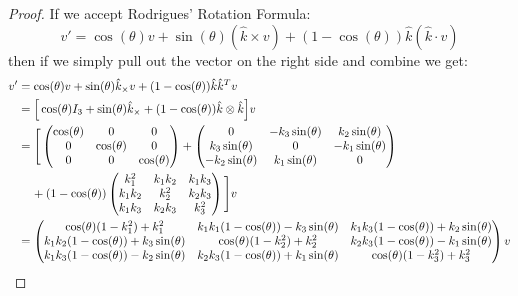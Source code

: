 \documentclass[12pt, letterpaper, onecolumn, conference, final]{IEEEtran}
\theoremstyle{definition}
\theoremstyle{plain}
\begin{document}
\begin{proof}
If we accept Rodrigues' Rotation Formula:
\begin{equation*}
v' = \cos(\theta)v + \sin(\theta)(\hat{k} \times v) + (1 - \cos(\theta))\hat{k}(\hat{k} \cdot v)
\end{equation*}
then if we simply pull out the vector on the right side and combine we get:
\begin{equation*}
\begin{split}
v' &= \cos(\theta)v + \sin(\theta)\hat{k}_{\times}v + (1 - \cos(\theta))\hat{k}\hat{k}^T v \\
&= \Big[ \cos(\theta)I_3 + \sin(\theta)\hat{k}_{\times} + (1 - \cos(\theta))\hat{k} \otimes \hat{k} \Big] v \\
&= \Bigg[ \begin{pmatrix}
\cos(\theta) & 0 & 0 \\
0 & \cos(\theta) & 0 \\
0 & 0 & \cos(\theta)
\end{pmatrix} + \begin{pmatrix}
0 & -k_3\sin(\theta) & k_2\sin(\theta) \\
k_3\sin(\theta) & 0 & -k_1\sin(\theta) \\
-k_2\sin(\theta) & k_1\sin(\theta) & 0
\end{pmatrix} \\
& \hspace{.4cm} + (1 - \cos(\theta))\begin{pmatrix}
k_1^2 & k_1k_2 & k_1k_3 \\
k_1k_2 & k_2^2 & k_2k_3 \\
k_1k_3 & k_2k_3 & k_3^2
\end{pmatrix} \Bigg] v \\
&= \begin{pmatrix}
\cos(\theta)(1 - k_1^2) + k_1^2 & k_1k_1(1 - \cos(\theta)) - k_3\sin(\theta) & k_1k_3(1 - \cos(\theta)) + k_2\sin(\theta) \\
k_1k_2(1 - \cos(\theta)) + k_3\sin(\theta) & \cos(\theta)(1 - k_2^2) + k_2^2 & k_2k_3(1 - \cos(\theta)) - k_1\sin(\theta) \\
k_1k_3(1 - \cos(\theta)) - k_2\sin(\theta) & k_2k_3(1 - \cos(\theta)) + k_1\sin(\theta) & \cos(\theta)(1 - k_3^2) + k_3^2
\end{pmatrix} v
\end{split}
\end{equation*}
\end{proof}
\end{document}
